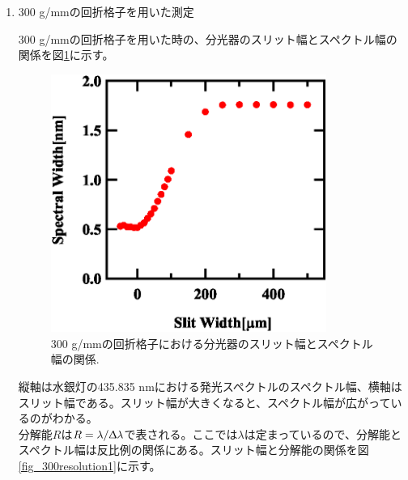 \documentclass[11pt,a4j]{jsarticle}
\begin{document}
\begin{enumerate}%
 \item 300 g/mmの回折格子を用いた測定

       300 g/mmの回折格子を用いた時の、分光器のスリット幅とスペクトル幅の関係を図\ref{fig_300spectrum1}に示す。

       \begin{figure}[ht]
        \centering
        \includegraphics[clip,width=9cm]{start1_300Spectrum1.eps}
        \caption{300 g/mmの回折格子における分光器のスリット幅とスペクトル幅の関係.}
        \label{fig_300spectrum1}
       \end{figure}


       縦軸は水銀灯の435.835 nmにおける発光スペクトルのスペクトル幅、横軸はスリット幅である。スリット幅が大きくなると、スペクトル幅が広がっているのがわかる。
       \\
       分解能$R$は$R=\lambda/\Updelta\lambda$で表される。ここでは$\lambda$は定まっているので、分解能とスペクトル幅は反比例の関係にある。スリット幅と分解能の関係を図\ref{fig_300resolution1}に示す。
       \newpage


\end{enumerate}
\end{document}
